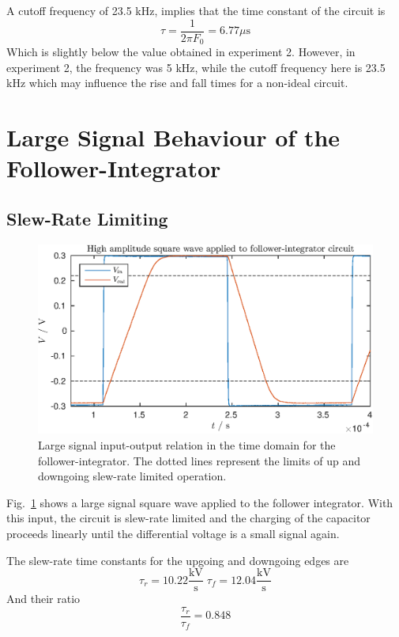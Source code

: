 A cutoff frequency of 23.5 kHz, implies that the time constant of the circuit is
\begin{equation*}
    \tau = \frac{1}{2\pi F_0} = 6.77 \mu\mathrm{s}
\end{equation*}
Which is slightly below the value obtained in experiment 2. However, in experiment 2, the frequency was 5 kHz, while the cutoff frequency here is 23.5 kHz which
may influence the rise and fall times for a non-ideal circuit.

\section{Large Signal Behaviour of the Follower-Integrator}
\subsection{Slew-Rate Limiting}
\begin{figure}
    \center
    \includegraphics{ex4-slew.eps}
    \caption{Large signal input-output relation in the time domain for the follower-integrator. The dotted lines represent the limits of up and downgoing slew-rate limited operation.}
    \label{fig:ex4-1}
\end{figure}
Fig.~\ref{fig:ex4-1} shows a large signal square wave applied to the follower integrator. With this input, the circuit is slew-rate limited
and the charging of the capacitor proceeds linearly until the differential voltage is a small signal again.

The slew-rate time constants for the upgoing and downgoing edges are
\begin{equation*}
    \tau_r = 10.22\frac{\mathrm{kV}}{\mathrm{s}} \; \tau_f = 12.04\frac{\mathrm{kV}}{\mathrm{s}}
\end{equation*}
And their ratio 
\begin{equation*}
    \frac{\tau_r}{\tau_f} = 0.848
\end{equation*}

